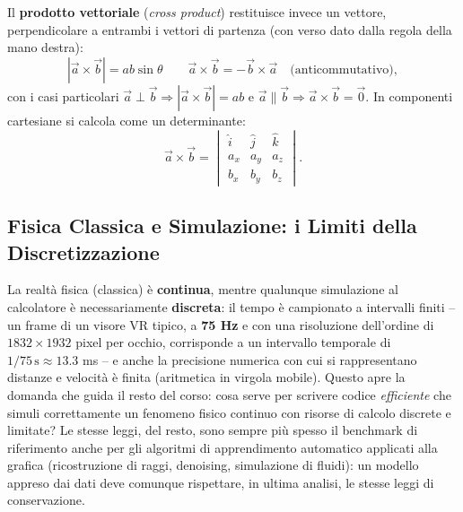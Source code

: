 \documentclass[a4paper,11pt]{article}
\begin{document}
\begin{center}
\end{center}

Il \textbf{prodotto vettoriale} (\emph{cross product}) restituisce invece un vettore, perpendicolare a entrambi i vettori di partenza (con verso dato dalla regola della mano destra):
\[
|\vec a \times \vec b| = ab\sin\theta \qquad \vec a \times \vec b = -\vec b \times \vec a \quad \text{(anticommutativo)},
\]
con i casi particolari $\vec a\perp\vec b \Rightarrow |\vec a\times\vec b|=ab$ e $\vec a\parallel\vec b \Rightarrow \vec a\times\vec b=\vec 0$. In componenti cartesiane si calcola come un determinante:
\[
\vec a \times \vec b = \begin{vmatrix} \hat i & \hat j & \hat k \\ a_x & a_y & a_z \\ b_x & b_y & b_z \end{vmatrix}.
\]

\subsection{Fisica Classica e Simulazione: i Limiti della Discretizzazione}

La realtà fisica (classica) è \textbf{continua}, mentre qualunque simulazione al calcolatore è necessariamente \textbf{discreta}: il tempo è campionato a intervalli finiti -- un frame di un visore VR tipico, a \textbf{75 Hz} e con una risoluzione dell'ordine di $1832\times1932$ pixel per occhio, corrisponde a un intervallo temporale di $1/75\,\text{s}\approx13.3$ ms -- e anche la precisione numerica con cui si rappresentano distanze e velocità è finita (aritmetica in virgola mobile). Questo apre la domanda che guida il resto del corso: cosa serve per scrivere codice \emph{efficiente} che simuli correttamente un fenomeno fisico continuo con risorse di calcolo discrete e limitate? Le stesse leggi, del resto, sono sempre più spesso il benchmark di riferimento anche per gli algoritmi di apprendimento automatico applicati alla grafica (ricostruzione di raggi, denoising, simulazione di fluidi): un modello appreso dai dati deve comunque rispettare, in ultima analisi, le stesse leggi di conservazione.
\end{document}
